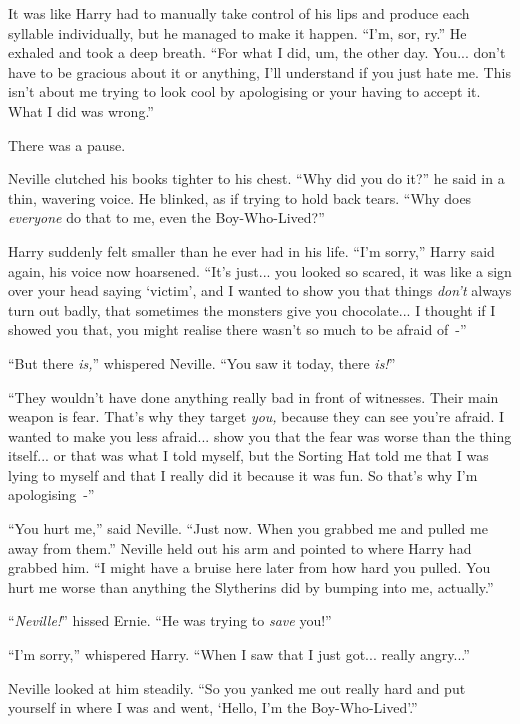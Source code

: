 It was like Harry had to manually take control of his lips and produce each syllable individually, but he managed to make it happen. ``I'm, sor, ry.'' He exhaled and took a deep breath. ``For what I did, um, the other day. You... don't have to be gracious about it or anything, I'll understand if you just hate me. This isn't about me trying to look cool by apologising or your having to accept it. What I did was wrong.''

There was a pause.

Neville clutched his books tighter to his chest. ``Why did you do it?'' he said in a thin, wavering voice. He blinked, as if trying to hold back tears. ``Why does \emph{everyone} do that to me, even the Boy-Who-Lived?''

Harry suddenly felt smaller than he ever had in his life. ``I'm sorry,'' Harry said again, his voice now hoarsened. ``It's just... you looked so scared, it was like a sign over your head saying `victim', and I wanted to show you that things \emph{don't} always turn out badly, that sometimes the monsters give you chocolate... I thought if I showed you that, you might realise there wasn't so much to be afraid of~-''

``But there \emph{is,}'' whispered Neville. ``You saw it today, there \emph{is!}''

``They wouldn't have done anything really bad in front of witnesses. Their main weapon is fear. That's why they target \emph{you,} because they can see you're afraid. I wanted to make you less afraid... show you that the fear was worse than the thing itself... or that was what I told myself, but the Sorting Hat told me that I was lying to myself and that I really did it because it was fun. So that's why I'm apologising~-''

``You hurt me,'' said Neville. ``Just now. When you grabbed me and pulled me away from them.'' Neville held out his arm and pointed to where Harry had grabbed him. ``I might have a bruise here later from how hard you pulled. You hurt me worse than anything the Slytherins did by bumping into me, actually.''

``\emph{Neville!}'' hissed Ernie. ``He was trying to \emph{save} you!''

``I'm sorry,'' whispered Harry. ``When I saw that I just got... really angry...''

Neville looked at him steadily. ``So you yanked me out really hard and put yourself in where I was and went, `Hello, I'm the Boy-Who-Lived'.''

